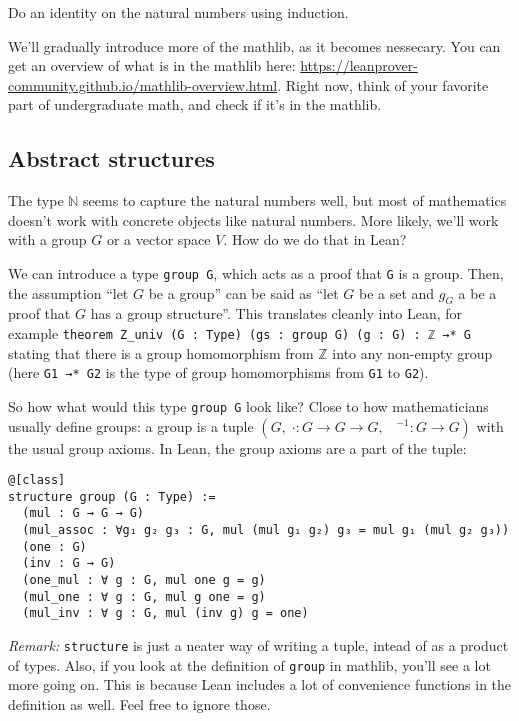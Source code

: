 \documentclass[a4paper, 12pt]{article}
\newcommand{\N}{\mathbb{N}}
\newcommand{\Z}{\mathbb{Z}}
\newcommand{\lean}[1]{\texttt{#1}}
\theoremstyle{changedot}
\theoremstyle{changedotbreak}
\theoremstyle{nonumberplain}
\begin{document}
{\color{red} Do an identity on the natural numbers using induction.}

We'll gradually introduce more of the mathlib, as it becomes nessecary. You can get an overview of what is in the mathlib here: {\footnotesize \url{https://leanprover-community.github.io/mathlib-overview.html}}. Right now, think of your favorite part of undergraduate math, and check if it's in the mathlib.

\subsection{Abstract structures}
The type $\N$ seems to capture the natural numbers well, but most of mathematics doesn't work with concrete objects like natural numbers. More likely, we'll work with a group $G$ or a vector space $V$. How do we do that in Lean?

We can introduce a type \lean{group G}, which acts as a proof that \lean{G} is a group. Then, the assumption ``let $G$ be a group'' can be said as ``let $G$ be a set and $g_{G}$ a be a proof that $G$ has a group structure''. This translates cleanly into Lean, for example \lean{theorem Z_univ (G : Type) (gs : group G) (g : G)  : ℤ →* G} stating that there is a group homomorphism from $\Z$ into any non-empty group (here \lean{G1 →* G2} is the type of group homomorphisms from \lean{G1} to \lean{G2}).

So how what would this type \lean{group G} look like? Close to how mathematicians usually define groups: a group is a tuple $(G,\; \cdot : G \to G \to G,\;\;\; ^{-1} : G \to G)$ with the usual group axioms. In Lean, the group axioms are a part of the tuple:

\begin{verbatim}
@[class]
structure group (G : Type) :=
  (mul : G → G → G)
  (mul_assoc : ∀g₁ g₂ g₃ : G, mul (mul g₁ g₂) g₃ = mul g₁ (mul g₂ g₃))
  (one : G)
  (inv : G → G)
  (one_mul : ∀ g : G, mul one g = g)
  (mul_one : ∀ g : G, mul g one = g)
  (mul_inv : ∀ g : G, mul (inv g) g = one)
\end{verbatim}

\textit{Remark:} \lean{structure} is just a neater way of writing a tuple, intead of as a product of types. Also, if you look at the definition of \lean{group} in mathlib, you'll see a lot more going on. This is because Lean includes a lot of convenience functions in the definition as well. Feel free to ignore those.
\end{document}
